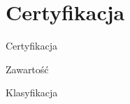 \section{Certyfikacja}

\begin{frame}{Certyfikacja}

\end{frame}

\begin{frame}{Zawartość}
	
\end{frame}

\begin{frame}{Klasyfikacja}
	
\end{frame}